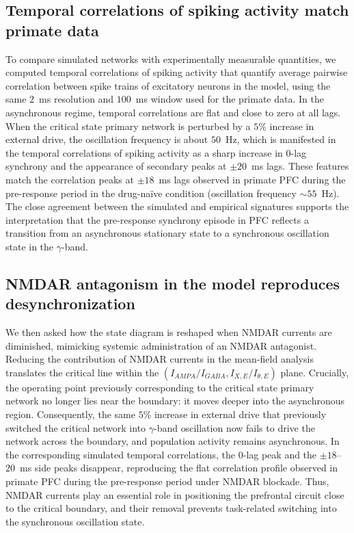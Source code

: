 \documentclass[11pt]{article}
\begin{document}
\subsection{Temporal correlations of spiking activity match primate data}

To compare simulated networks with experimentally measurable quantities, we computed temporal correlations of spiking activity that quantify average pairwise correlation between spike trains of excitatory neurons in the model, using the same $2$~ms resolution and $100$~ms window used for the primate data. In the asynchronous regime, temporal correlations are flat and close to zero at all lags. When the critical state primary network is perturbed by a $5\%$ increase in external drive, the oscillation frequency is about $50$~Hz, which is manifested in the temporal correlations of spiking activity as a sharp increase in $0$-lag synchrony and the appearance of secondary peaks at $\pm 20$~ms lags. These features match the correlation peaks at $\pm 18$~ms lags observed in primate PFC during the pre-response period in the drug-na\"ive condition (oscillation frequency $\sim 55$~Hz). The close agreement between the simulated and empirical signatures supports the interpretation that the pre-response synchrony episode in PFC reflects a transition from an asynchronous stationary state to a synchronous oscillation state in the $\gamma$-band.

\subsection{NMDAR antagonism in the model reproduces desynchronization}

We then asked how the state diagram is reshaped when NMDAR currents are diminished, mimicking systemic administration of an NMDAR antagonist. Reducing the contribution of NMDAR currents in the mean-field analysis translates the critical line within the $(I_{AMPA}/I_{GABA}, I_{X,E}/I_{\theta,E})$ plane. Crucially, the operating point previously corresponding to the critical state primary network no longer lies near the boundary: it moves deeper into the asynchronous region. Consequently, the same $5\%$ increase in external drive that previously switched the critical network into $\gamma$-band oscillation now fails to drive the network across the boundary, and population activity remains asynchronous. In the corresponding simulated temporal correlations, the $0$-lag peak and the $\pm 18$--$20$~ms side peaks disappear, reproducing the flat correlation profile observed in primate PFC during the pre-response period under NMDAR blockade. Thus, NMDAR currents play an essential role in positioning the prefrontal circuit close to the critical boundary, and their removal prevents task-related switching into the synchronous oscillation state.
\end{document}
